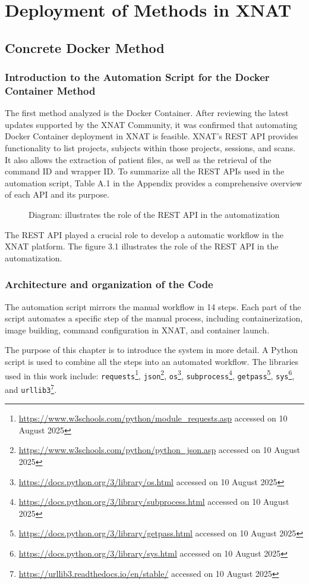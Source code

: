 \chapter{Deployment of Methods in XNAT}
\section{Concrete Docker Method}


\subsection{Introduction to the Automation Script for the Docker Container Method}
The first method analyzed is the Docker Container. After reviewing the latest updates supported by the XNAT Community, it was confirmed that automating Docker Container deployment in XNAT is feasible.
XNAT's REST API provides functionality to list projects, subjects within those projects, sessions, and scans. It also allows the extraction of patient files, as well as the retrieval of the command ID and wrapper ID.
To summarize all the REST APIs used in the automation script, Table A.1 in the Appendix provides a comprehensive overview of each API and its purpose.

\begin{figure}[H]
    \centering
    \def\svgwidth{0.9\linewidth}
    
    \caption{Diagram: illustrates the role of the REST API in the automatization}
    \label{fig:workflow-steps}
\end{figure}


The REST API played a crucial role to develop a automatic workflow in the XNAT platform. The figure 3.1 illustrates the role of the REST API in the automatization.



\subsection{Architecture and organization of the Code}
The automation script mirrors the manual workflow in 14 steps. Each part of the script automates a specific step of the manual process, including containerization, image building, command configuration in XNAT, and container launch.

The purpose of this chapter is to introduce the system in more detail. A Python script is used to combine all the steps into an automated workflow. The libraries used in this work include: \texttt{requests}\footnote{\url{https://www.w3schools.com/python/module_requests.asp} accessed on 10 August 2025}, \texttt{json}\footnote{\url{https://www.w3schools.com/python/python_json.asp} accessed on 10 August 2025}, \texttt{os}\footnote{\url{https://docs.python.org/3/library/os.html} accessed on 10 August 2025}, \texttt{subprocess}\footnote{\url{https://docs.python.org/3/library/subprocess.html} accessed on 10 August 2025}, \texttt{getpass}\footnote{\url{https://docs.python.org/3/library/getpass.html} accessed on 10 August 2025}, \texttt{sys}\footnote{\url{https://docs.python.org/3/library/sys.html} accessed on 10 August 2025}, and \texttt{urllib3}\footnote{\url{https://urllib3.readthedocs.io/en/stable/} accessed on 10 August 2025}.

